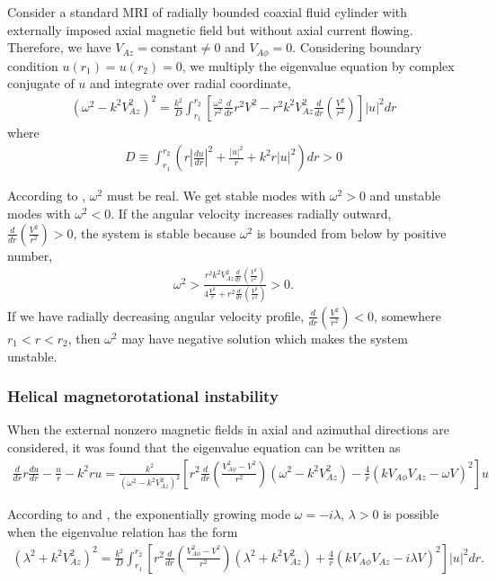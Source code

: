\documentclass{jfm}
\begin{document}
Consider a standard MRI of radially bounded coaxial fluid cylinder with 
externally imposed axial magnetic field but without axial current flowing. 
Therefore, we have $V_{Az} = \text{constant} \neq 0$ and 
$V_{A\phi} = 0$. Considering boundary condition 
$u(r_1)=u(r_2)=0$, we multiply the eigenvalue equation by complex conjugate 
of $u$ and integrate over radial coordinate,
\begin{align}
    (\omega^2-k^2 V_{Az}^2)^2 = \frac{k^2}{D}\int_{r_1}^{r_2}\left[\frac{\omega^2}{r^2}\frac{d}{dr}r^2V^2 -r^2 k^2 V_{Az}^2 \frac{d}{dr}\left(\frac{V^2}{r^2}\right)\right]|u|^2 dr
\end{align}   
where 
\begin{align}
    D\equiv \int_{r_1}^{r_2}\left(r \left|\frac{du}{dr}\right|^2 +\frac{|u|^2}{r}+k^2 r |u|^2 \right) dr >0
\end{align}

According to \cite{Chandrasekhar1960}, $\omega^2$ must be real. We get stable 
modes with $\omega^2>0$ and unstable modes with $\omega^2<0$. If the angular 
velocity increases radially outward, $\frac{d}{dr}\left(\frac{V^2}{r^2}\right)>0$, 
the system is stable because $\omega^2$ is bounded from below by positive number, 
\begin{align}
    \omega^2>\frac{r^2k^2 V_{Az}^2 \frac{d}{dr}\left(\frac{V^2}{r^2}\right)}{4\frac{V^2}{r}+r^2\frac{d}{dr}\left(\frac{V^2}{r^2}\right)}>0.
\end{align}
If we have radially decreasing angular velocity profile, 
$\frac{d}{dr}\left(\frac{V^2}{r^2}\right)<0$, somewhere $r_1<r<r_2$, then 
$\omega^2$ may have negative solution which makes the system unstable.

\subsubsection{Helical magnetorotational instability}

When the external nonzero magnetic fields in axial and azimuthal directions are
considered, it was found that the eigenvalue equation can be written as
\begin{align}
    \frac{d}{dr}r\frac{du}{dr}-\frac{u}{r}-k^2ru = \frac{k^2}{(\omega^2-k^2 V_{Az}^2)^2}\left[r^2 \frac{d}{dr}\left(\frac{V_{A\phi}^2-V^2}{r^2}\right)
    (\omega^2-k^2V_{Az}^2) 
    -\frac{4}{r}(kV_{A\phi}V_{Az}-\omega V)^2\right]u
\end{align}

According to \cite{Knobloch1992} and \cite{Julien2010}, the exponentially 
growing mode $\omega =-i\lambda$, $\lambda>0$ is possible when the eigenvalue 
relation has the form
\begin{align}
    (\lambda^2 +k^2 V_{Az}^2)^2 = \frac{k^2}{D}\int_{r_1}^{r_2} \left[ r^2 \frac{d}{dr}\left( \frac{V_{A\phi}^2-V^2}{r^2}\right)(\lambda^2+k^2 V_{Az}^2) + \frac{4}{r}(k V_{A\phi} V_{Az}-i\lambda V)^2 \right]|u|^2 dr.
\end{align}
\end{document}
